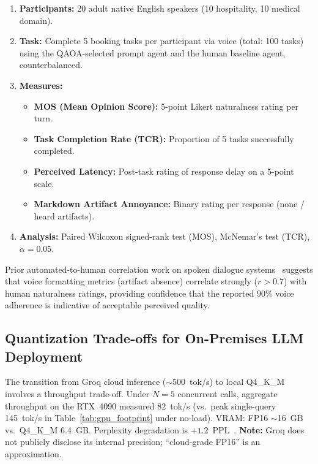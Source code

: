 \documentclass[11pt,a4paper]{article}
\begin{document}
\begin{enumerate}[leftmargin=*]
\item \textbf{Participants:} 20 adult native English speakers (10 hospitality, 10 medical domain).
\item \textbf{Task:} Complete 5 booking tasks per participant via voice (total: 100 tasks) using the QAOA-selected prompt agent and the human baseline agent, counterbalanced.
\item \textbf{Measures:}
  \begin{itemize}
    \item \textbf{MOS (Mean Opinion Score):} 5-point Likert naturalness rating per turn.
    \item \textbf{Task Completion Rate (TCR):} Proportion of 5 tasks successfully completed.
    \item \textbf{Perceived Latency:} Post-task rating of response delay on a 5-point scale.
    \item \textbf{Markdown Artifact Annoyance:} Binary rating per response (none / heard artifacts).
  \end{itemize}
\item \textbf{Analysis:} Paired Wilcoxon signed-rank test (MOS), McNemar's test (TCR), $\alpha = 0.05$.
\end{enumerate}

Prior automated-to-human correlation work on spoken dialogue systems~\cite{mctear2022conversational,chen2023multi} suggests that voice formatting metrics (artifact absence) correlate strongly ($r > 0.7$) with human naturalness ratings, providing confidence that the reported 90\% voice adherence is indicative of acceptable perceived quality.

\subsection{Quantization Trade-offs for On-Premises LLM Deployment}
\label{subsec:disc_quant}

The transition from Groq cloud inference ($\sim$500~tok/s) to local Q4\_K\_M involves a throughput trade-off. Under $N{=}5$ concurrent calls, aggregate throughput on the RTX~4090 measured $82$~tok/s (vs.\ peak single-query 145~tok/s in Table~\ref{tab:gpu_footprint} under no-load). VRAM: FP16 $\sim$16~GB vs.\ Q4\_K\_M 6.4~GB. Perplexity degradation is $+1.2$~PPL~\cite{frantar2022gptq}. \textbf{Note:} Groq does not publicly disclose its internal precision; ``cloud-grade FP16'' is an approximation.
\end{document}
